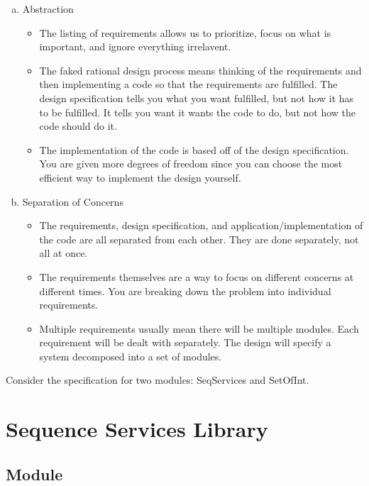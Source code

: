 \documentclass[12pt,fleqn]{examtst}
\begin{document}
\begin{enumerate}[a)]
\item Abstraction
  \begin{itemize}
  \item The listing of requirements allows us to prioritize, focus on what is important, and ignore everything irrelavent.
  \item The faked rational design process means thinking of the requirements and then implementing a code so that the requirements are fulfilled. The design specification tells you what you want fulfilled, but not how it has to be fulfilled. It tells you want it wants the code to do, but not how the code should do it.
  \item The implementation of the code is based off of the design specification. You are given more degrees of freedom since you can choose the most efficient way to implement the design yourself.
  \end{itemize}
\item Separation of Concerns
  \begin{itemize}
  \item The requirements, design specification, and application/implementation of the code are all separated from each other. They are done separately, not all at once.
  \item The requirements themselves are a way to focus on different concerns at different times. You are breaking down the problem into individual requirements.
  \item Multiple requirements usually mean there will be multiple modules. Each requirement will be dealt with separately. The design will specify a system decomposed into a set of modules. 
  \end{itemize}
\end{enumerate}


\newpage

\noindent Consider the specification for two modules: SeqServices and SetOfInt.

\section* {Sequence Services Library}

\subsection*{Module}
\end{document}
